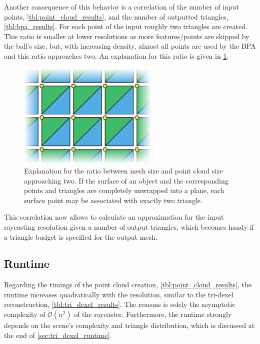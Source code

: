 Another consequence of this behavior is a correlation of the number of input points, \cf \cref{tbl:point_cloud_results}, and the number of outputted triangles, \cf \cref{tbl:bpa_results}.
For each point of the input roughly two triangles are created.
This ratio is smaller at lower resolutions as more features/points are skipped by the ball's size, but, with increasing density, almost all points are used by the BPA and this ratio approaches two.
An explanation for this ratio is given in \cref{fig:bpa_point_triangle_ratio}.
%
\begin{figure}
	\centering
	\includegraphics[width=0.6\textwidth]{images/bpa_point_triangle_ratio}
	\caption{
		Explanation for the ratio between mesh size and point cloud size approaching two.
		If the surface of an object and the corresponding points and triangles are completely unwrapped into a plane, each surface point may be associated with exactly two triangle.
	}
	\label{fig:bpa_point_triangle_ratio}
\end{figure}
%
This correlation now allows to calculate an approximation for the input raycasting resolution given a number of output triangles, which becomes handy if a triangle budget is specified for the output mesh.


\subsection{Runtime}

Regarding the timings of the point cloud creation, \cf \cref{tbl:point_cloud_results}, the runtime increases quadratically with the resolution, similar to the tri-dexel reconstruction, \cf \cref{tbl:tri_dexel_results}.
The reasons is solely the asymptotic complexity of $\mathcal{O}(n^2)$ of the raycaster.
Furthermore, the runtime strongly depends on the scene's complexity and triangle distribution, which is discussed at the end of \cref{sec:tri_dexel_runtime}.

